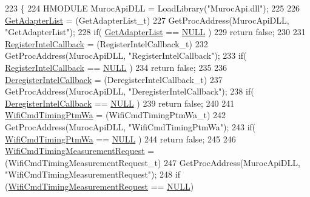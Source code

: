 \begin{DoxyCode}
223 \{
224     HMODULE MurocApiDLL = LoadLibrary(\textcolor{stringliteral}{"MurocApi.dll"});
225 
226     \hyperlink{intel__wireless_8cpp_a6af9beb02eb483e4e0abe6fc472efecd}{GetAdapterList} = (GetAdapterList\_t)
227         GetProcAddress(MurocApiDLL, \textcolor{stringliteral}{"GetAdapterList"});
228     \textcolor{keywordflow}{if}( \hyperlink{intel__wireless_8cpp_a6af9beb02eb483e4e0abe6fc472efecd}{GetAdapterList} == \hyperlink{openavb__types__base__pub_8h_a070d2ce7b6bb7e5c05602aa8c308d0c4}{NULL} )
229         \textcolor{keywordflow}{return} \textcolor{keyword}{false};
230 
231     \hyperlink{intel__wireless_8cpp_ac3b34ea5bc214b2c03d6ed4b220ea945}{RegisterIntelCallback} =    (RegisterIntelCallback\_t)
232         GetProcAddress(MurocApiDLL, \textcolor{stringliteral}{"RegisterIntelCallback"});
233     \textcolor{keywordflow}{if}( \hyperlink{intel__wireless_8cpp_ac3b34ea5bc214b2c03d6ed4b220ea945}{RegisterIntelCallback} == \hyperlink{openavb__types__base__pub_8h_a070d2ce7b6bb7e5c05602aa8c308d0c4}{NULL} )
234         \textcolor{keywordflow}{return} \textcolor{keyword}{false};
235 
236     \hyperlink{intel__wireless_8cpp_a5f26056948d2e1f7ceeacbf13d62877a}{DeregisterIntelCallback} = (DeregisterIntelCallback\_t)
237         GetProcAddress(MurocApiDLL, \textcolor{stringliteral}{"DeregisterIntelCallback"});
238     \textcolor{keywordflow}{if}( \hyperlink{intel__wireless_8cpp_a5f26056948d2e1f7ceeacbf13d62877a}{DeregisterIntelCallback} == \hyperlink{openavb__types__base__pub_8h_a070d2ce7b6bb7e5c05602aa8c308d0c4}{NULL} )
239         \textcolor{keywordflow}{return} \textcolor{keyword}{false};
240 
241     \hyperlink{intel__wireless_8cpp_aeb01f9db493ae3b99af76be36d47eda8}{WifiCmdTimingPtmWa} = (WifiCmdTimingPtmWa\_t)
242         GetProcAddress(MurocApiDLL, \textcolor{stringliteral}{"WifiCmdTimingPtmWa"});
243     \textcolor{keywordflow}{if}( \hyperlink{intel__wireless_8cpp_aeb01f9db493ae3b99af76be36d47eda8}{WifiCmdTimingPtmWa} == \hyperlink{openavb__types__base__pub_8h_a070d2ce7b6bb7e5c05602aa8c308d0c4}{NULL} )
244         \textcolor{keywordflow}{return} \textcolor{keyword}{false};
245 
246     \hyperlink{intel__wireless_8cpp_a7f6550d1de9728ddf81a84789d74d008}{WifiCmdTimingMeasurementRequest} = (WifiCmdTimingMeasurementRequest\_t)
247         GetProcAddress(MurocApiDLL, \textcolor{stringliteral}{"WifiCmdTimingMeasurementRequest"});
248     \textcolor{keywordflow}{if} (\hyperlink{intel__wireless_8cpp_a7f6550d1de9728ddf81a84789d74d008}{WifiCmdTimingMeasurementRequest} == \hyperlink{openavb__types__base__pub_8h_a070d2ce7b6bb7e5c05602aa8c308d0c4}{NULL})

\end{DoxyCode}
